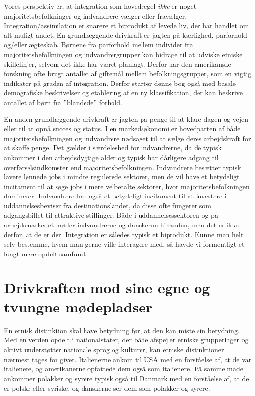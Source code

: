 \documentclass[
]{book}
\begin{document}
Vores perspektiv er, at integration som hovedregel \emph{ikke} er noget majoritetsbefolkninger og indvandrere vælger eller fravælger. Integration/assimilation er snarere et biprodukt af levede liv, der har handlet om alt muligt andet. En grundlæggende drivkraft er jagten på kærlighed, parforhold og/eller ægteskab. Børnene fra parforhold mellem individer fra majoritetsbefolkningen og indvandrergrupper kan bidrage til at udviske etniske skillelinjer, selvom det ikke har været planlagt. Derfor har den amerikanske forskning ofte brugt antallet af giftemål mellem befolkningsgrupper, som en vigtig indikator på graden af integration. Derfor starter denne bog også med basale demografiske beskrivelser og etablering af en ny klassifikation, der kan beskrive antallet af børn fra ''blandede'' forhold.

En anden grundlæggende drivkraft er jagten på penge til at klare dagen og vejen eller til at opnå succes og status. I en markedsøkonomi er hovedparten af både majoritetsbefolkningen og indvandrere nødsaget til at sælge deres arbejdskraft for at skaffe penge. Det gælder i særdeleshed for indvandrerne, da de typisk ankommer i den arbejdsdygtige alder og typisk har dårligere adgang til overførselsindkomster end majoritetsbefolkningen. Indvandrere besætter typisk lavere lønnede jobs i mindre regulerede sektorer, men de vil have et betydeligt incitament til at søge jobs i mere velbetalte sektorer, hvor majoritetsbefolkningen dominerer. Indvandrere har også et betydeligt incitament til at investere i uddannelsesbeviser fra destinationslandet, da disse ofte fungerer som adgangsbillet til attraktive stillinger. Både i uddannelsessektoren og på arbejdsmarkedet møder indvandrerne og danskerne hinanden, men det er ikke derfor, at de er der. Integration er således typisk et biprodukt. Kunne man helt selv bestemme, hvem man gerne ville interagere med, så havde vi formentligt et langt mere opdelt samfund.

\section{Drivkraften mod sine egne og tvungne mødepladser}\label{drivkraften-mod-sine-egne-og-tvungne-muxf8depladser}

En etnisk distinktion skal have betydning før, at den kan miste sin betydning. Med en verden opdelt i nationalstater, der både afspejler etniske grupperinger og aktivt understøtter nationale sprog og kulturer, kan etniske distinktioner nærmest tages for givet. Italienerne ankom til USA med en forståelse af, at de var italienere, og amerikanerne opfattede dem også som italienere. På samme måde ankommer polakker og syrere typisk også til Danmark med en forståelse af, at de er polske eller syriske, og danskerne ser dem som polakker og syrere.
\end{document}
